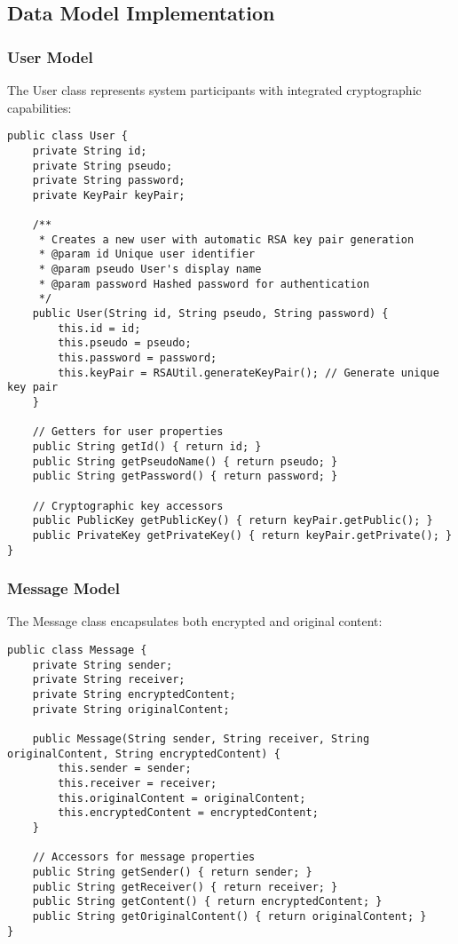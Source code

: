\documentclass[12pt,a4paper]{article}
\begin{document}
\subsection{Data Model Implementation}

\subsubsection{User Model}

The User class represents system participants with integrated cryptographic capabilities:

\begin{lstlisting}[caption=User Model with Cryptographic Integration]
public class User {
    private String id;
    private String pseudo;
    private String password;
    private KeyPair keyPair;

    /**
     * Creates a new user with automatic RSA key pair generation
     * @param id Unique user identifier
     * @param pseudo User's display name
     * @param password Hashed password for authentication
     */
    public User(String id, String pseudo, String password) {
        this.id = id;
        this.pseudo = pseudo;
        this.password = password;
        this.keyPair = RSAUtil.generateKeyPair(); // Generate unique key pair
    }

    // Getters for user properties
    public String getId() { return id; }
    public String getPseudoName() { return pseudo; }
    public String getPassword() { return password; }

    // Cryptographic key accessors
    public PublicKey getPublicKey() { return keyPair.getPublic(); }
    public PrivateKey getPrivateKey() { return keyPair.getPrivate(); }
}
\end{lstlisting}

\subsubsection{Message Model}

The Message class encapsulates both encrypted and original content:

\begin{lstlisting}[caption=Message Model Implementation]
public class Message {
    private String sender;
    private String receiver;
    private String encryptedContent;
    private String originalContent;

    public Message(String sender, String receiver, String originalContent, String encryptedContent) {
        this.sender = sender;
        this.receiver = receiver;
        this.originalContent = originalContent;
        this.encryptedContent = encryptedContent;
    }

    // Accessors for message properties
    public String getSender() { return sender; }
    public String getReceiver() { return receiver; }
    public String getContent() { return encryptedContent; }
    public String getOriginalContent() { return originalContent; }
}
\end{lstlisting}
\end{document}
